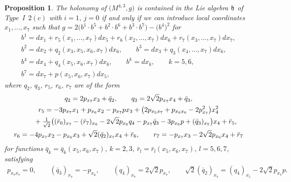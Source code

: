 \documentclass[11pt]{article}
\numberwithin{equation}{section}
\newtheorem{Proposition}[Theorem]{Proposition}
 { \theoremstyle{definition}
\newtheorem{Definition}[Theorem]{Definition}
\newtheorem{Example}[Theorem]{Example}
\newtheorem{Remark}[Theorem]{Remark} }
\newcommand\fh{{\frak h}}
\begin{document}
\begin{Proposition} \label{P2ci} The holonomy of $\big(M^{4,3},g\big)$ is contained in the Lie algebra $\fh$ of Type~I~$2(c)$ with $i=1$, $j=0$ if and only if we can introduce local coordinates $x_1,\dots,x_7$ such that $g=2\big(b^1\cdot b^5+b^2\cdot b^6+b^3\cdot b^7\big)- \big(b^4\big)^2$ for
\begin{gather*}
b^1 = dx_1 + r_5(x_1,\dots, x_7)dx_5+r_6(x_2,\dots,x_7)dx_6+r_7(x_3,\dots,x_7)dx_7, \\
b^2 = dx_2+q_2(x_3,x_5,x_6,x_7)dx_6, \qquad
b^3 = dx_3+q_3(x_4,\dots,x_7) dx_6, \\
b^4 = dx_4+q_4(x_5,x_6,x_7)dx_6, \qquad
b^k = dx_k,\qquad k=5,6, \\
b^7 = dx_7 +p(x_5,x_6,x_7)dx_5,
\end{gather*}
where $q_2$, $q_3$, $r_5$, $r_6$, $r_7$ are of the form
\begin{gather*}
q_2 = 2p_{x_7}x_3+\bar q_2,\qquad
q_3 = 2\sqrt 2 p_{x_7}x_4+\bar q_3,\\
r_5 = -3p_{x_7}x_1+p_{x_6} x_2-p_{x_7}px_3 + \big(2 p_{x_5x_7}+p_{x_6 x_6}-2p_{x_7}^2\big)x_4^2 \\
 \hphantom{r_5 =}{} + \tfrac1{\sqrt2} \big((\bar r_6)_{x_7}-(\bar r_7)_{x_6}-2\sqrt2 p_{x_6}q_4-p_{x_7}\bar q_3 -3p_{x_6}p+(\bar q_3)_{x_5}\big)x_4+\bar r_5,\\
r_6 = -4p_{x_7}x_2- p_{x_6}x_3+\sqrt2 (\bar q_2)_{x_7}x_4+\bar r_6,\qquad
r_7 = -p_{x_7}x_3-2\sqrt2 p_{x_6}x_4+\bar r_7
\end{gather*}
for functions $\bar q_k=\bar q_k(x_5,x_6,x_7)$, $k=2,3$, $\bar r_l=\bar r_l(x_5,x_6,x_7)$, $l=5,6,7$, satisfying
\begin{gather*}p_{x_7 x_7}=0, \qquad (\bar q_3)_{x_7}=-p_{x_6},\qquad (q_4)_{x_7}=2\sqrt2 p_{x_7}, \qquad
\sqrt2 (\bar q_2)_{x_7}=(q_4)_{x_5}-2\sqrt2 p_{x_7}p.
\end{gather*}
\end{Proposition}
\end{document}
